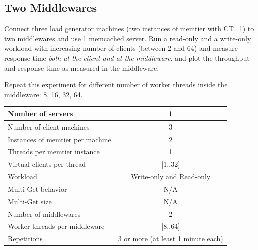 \documentclass[11pt,a4paper]{article}
\begin{document}
\subsection{Two Middlewares}

Connect three load generator machines (two instances of memtier with CT=1) to two middlewares and use 1 memcached server. Run a read-only and a write-only workload with increasing number of clients (between 2 and 64) and measure response time \emph{both at the client and at the middleware}, and plot the throughput and response time as measured in the middleware.

Repeat this experiment for different number of worker threads inside the middleware: 8, 16, 32, 64.

\begin{center}
	\scriptsize{
		\begin{tabular}{|l|c|}
			\hline Number of servers                & 1                        \\ 
			\hline Number of client machines        & 3                        \\ 
			\hline Instances of memtier per machine & 2                        \\ 
			\hline Threads per memtier instance     & 1                        \\
			\hline Virtual clients per thread       & [1..32]                  \\ 
			\hline Workload                         & Write-only and Read-only \\
			\hline Multi-Get behavior               & N/A                      \\
			\hline Multi-Get size                   & N/A                      \\
			\hline Number of middlewares            & 2                        \\
			\hline Worker threads per middleware    & [8..64]                  \\
			\hline Repetitions                      & 3 or more (at least 1 minute each)                \\ 
			\hline 
		\end{tabular}
	} 
\end{center}
\end{document}
